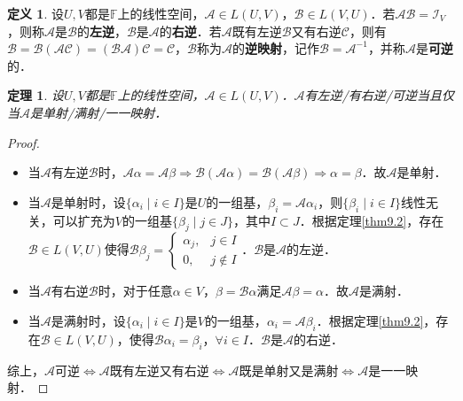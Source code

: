 \documentclass[a4paper,fontset=windows]{ctexbook}
\newtheorem{theorem}{定理}[chapter]
\theoremstyle{definition}
\newtheorem{definition}{定义}[chapter]
\begin{document}
\begin{definition}
设$U,V$都是$\mathbb{F}$上的线性空间，$\mathcal{A}\in L(U,V)$，$\mathcal{B}\in L(V,U)$．若$\mathcal{AB=I}_V$，则称$\mathcal{A}$是$\mathcal{B}$的{\bf 左逆}，$\mathcal{B}$是$\mathcal{A}$的{\bf 右逆}．若$\mathcal{A}$既有左逆$\mathcal{B}$又有右逆$\mathcal{C}$，则有$\mathcal{B=B(AC)=(BA)C=C}$，$\mathcal{B}$称为$\mathcal{A}$的{\bf 逆映射}，记作$\mathcal{B=A}^{-1}$，并称$\mathcal{A}$是{\bf 可逆}的．
\end{definition}

\begin{theorem}
设$U,V$都是$\mathbb{F}$上的线性空间，$\mathcal{A}\in L(U,V)$．$\mathcal{A}$有左逆/有右逆/可逆当且仅当$\mathcal{A}$是单射/满射/一一映射．
\end{theorem}

\begin{proof}~
\begin{itemize}
\item 当$\mathcal{A}$有左逆$\mathcal{B}$时，$\mathcal{A}\alpha=\mathcal{A}\beta\Rightarrow \mathcal{B}(\mathcal{A}\alpha)=\mathcal{B}(\mathcal{A}\beta)\Rightarrow\alpha=\beta$．故$\mathcal{A}$是单射．

\item 当$\mathcal{A}$是单射时，设$\{\alpha_i\mid i\in I\}$是$U$的一组基，$\beta_i=\mathcal{A}\alpha_i$，则$\{\beta_i\mid i\in I\}$线性无关，可以扩充为$V$的一组基$\{\beta_j\mid j\in J\}$，其中$I\subset J$．根据定理\ref{thm9.2}，存在$\mathcal{B}\in L(V,U)$使得$\mathcal{B}\beta_j=\begin{cases}\alpha_j,&j\in I \\ 0,&j\notin I\end{cases}$．$\mathcal{B}$是$\mathcal{A}$的左逆．

\item 当$\mathcal{A}$有右逆$\mathcal{B}$时，对于任意$\alpha\in V$，$\beta=\mathcal{B}\alpha$满足$\mathcal{A}\beta=\alpha$．故$\mathcal{A}$是满射．

\item 当$\mathcal{A}$是满射时，设$\{\alpha_i\mid i\in I\}$是$V$的一组基，$\alpha_i=\mathcal{A}\beta_i$．根据定理\ref{thm9.2}，存在$\mathcal{B}\in L(V,U)$，使得$\mathcal{B}\alpha_i=\beta_i$，$\forall i\in I$．$\mathcal{B}$是$\mathcal{A}$的右逆．
\end{itemize}
综上，$\mathcal{A}$可逆$\Leftrightarrow\mathcal{A}$既有左逆又有右逆$\Leftrightarrow\mathcal{A}$既是单射又是满射$\Leftrightarrow\mathcal{A}$是一一映射．
\end{proof}
\end{document}
